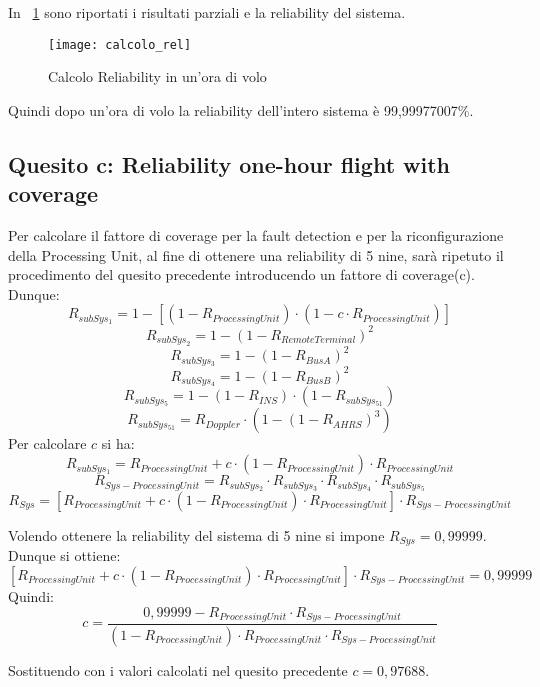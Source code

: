 \clearpage

In \figurename~\ref{dep_calcolo_rel} sono riportati i risultati parziali e la
reliability del sistema.\\

\begin{figure}[!htbp]
  \centering
  \texttt{[image: calcolo\_rel]}
  \caption{Calcolo Reliability in un'ora di volo}
  \label{dep_calcolo_rel}
\end{figure}

Quindi dopo un'ora di volo la reliability dell'intero sistema è 99,99977007\%.\\

\clearpage

\subsection{Quesito c: Reliability one-hour flight with coverage}

Per calcolare il fattore di coverage per la fault detection e per la riconfigurazione
della Processing Unit, al fine di ottenere una reliability di 5 nine, sarà ripetuto
il procedimento del quesito precedente introducendo un fattore di coverage(c).\\
Dunque:
$$R_{subSys_1} = 1 -[ (1 - R_{ProcessingUnit}) \cdot (1-c\cdot R_{ProcessingUnit})]$$
$$R_{subSys_2} = 1 - (1 - R_{RemoteTerminal})^2$$
$$R_{subSys_3} = 1 - (1 - R_{BusA})^2$$
$$R_{subSys_4} = 1 - (1 - R_{BusB})^2$$
$$R_{subSys_5} = 1 - (1 - R_{INS}) \cdot (1 - R_{subSys_{51}})$$
$$R_{subSys_{51}} = R_{Doppler} \cdot (1 - (1 - R_{AHRS})^3)$$
Per calcolare $c$ si ha:
$$R_{subSys_1} = R_{ProcessingUnit}+c\cdot(1-R_{ProcessingUnit} )\cdot R_{ProcessingUnit}$$
$$R_{Sys-ProcessingUnit} =  R_{subSys_2} \cdot R_{subSys_3} \cdot R_{subSys_4} \cdot R_{subSys_5}$$
$$R_{Sys}=[R_{ProcessingUnit}+c\cdot(1-R_{ProcessingUnit})\cdot R_{ProcessingUnit}]\cdot R_{Sys-ProcessingUnit}$$

\vspace{0.4cm}
Volendo ottenere la reliability del sistema di 5 nine si impone $R_{Sys}=0,99999$.\\
Dunque si ottiene:
$$[R_{ProcessingUnit}+c\cdot(1-R_{ProcessingUnit})\cdot R_{ProcessingUnit}]\cdot R_{Sys-ProcessingUnit}=0,99999$$
Quindi:
$$ c = \frac{0,99999-R_{ProcessingUnit}\cdot R_{Sys-ProcessingUnit}}{(1-R_{ProcessingUnit})\cdot R_{ProcessingUnit} \cdot R_{Sys-ProcessingUnit}}$$

\vspace{0.4cm}
Sostituendo con i valori calcolati nel quesito precedente $c=0,97688$.\\
